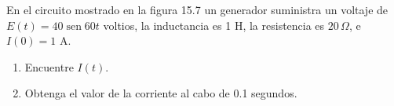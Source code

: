 \item En el circuito mostrado en la figura 15.7 un generador suministra un voltaje de $E(t) = 40 \operatorname{sen} 60t$ voltios, la inductancia es 1 H, la resistencia es $20 \, \Omega$, e $I(0) = 1 \text{ A}$.
    \begin{enumerate}
        \item[(a)] Encuentre $I(t)$.
        \item[(b)] Obtenga el valor de la corriente al cabo de 0.1 segundos.
    \end{enumerate}
